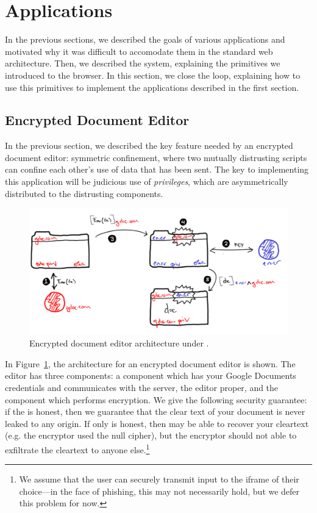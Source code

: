 \section{Applications}
\label{sec:apps}

In the previous sections, we described the goals of various applications
and motivated why it was difficult to accomodate them in the standard
web architecture.  Then, we described the \sys{} system, explaining the
primitives we introduced to the browser.  In this section, we close the
loop, explaining how to use this primitives to implement the
applications described in the first section.

\subsection{Encrypted Document Editor}

In the previous section, we described the key feature needed by an
encrypted document editor: symmetric confinement, where two mutually
distrusting scripts can confine each other's use of data that has been
sent.  The key to implementing this application will be judicious use of
\emph{privileges}, which are asymmetrically distributed to the
distrusting components.

\begin{figure}
\centerline{\includegraphics[width=\columnwidth]{editor2-byhand}}
\caption{\label{fig:editor} Encrypted document editor architecture
under \sys{}.}
\end{figure}

In Figure~\ref{fig:editor}, the architecture for an encrypted document
editor is shown.  The editor has three components: a component which has
your Google Documents credentials and communicates with the server, the
editor proper, and the component which performs encryption.  We give the
following security guarantee: if the  is honest, then we
guarantee that the clear text of your document is never leaked to any
origin.  If only  is honest, then  may
be able to recover your cleartext (e.g. the encryptor used the null
cipher), but the encryptor should not able to exfiltrate the cleartext
to anyone else.\footnote{We assume that the user can securely transmit
input to the iframe of their choice---in the face of phishing, this may
not necessarily hold, but we defer this problem for now.}

